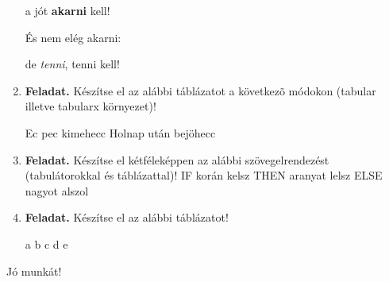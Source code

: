 \documentclass[12pt,a4paper]{article}
\begin{document}
\begin{enumerate}
\begin{center}
              a jót \textbf{akarni} kell! \par
              És nem elég akarni: \par
              de \textit{tenni},  tenni kell! \par
          \end{center}
    \item
          \textbf{Feladat.} Készítse el az alábbi táblázatot a következõ módokon (tabular illetve tabularx környezet)!
          \par

          Ec pec kimehecc
          Holnap után bejöhecc
          \par
    \item
          \textbf{Feladat.} Készítse el kétféleképpen az alábbi szövegelrendezést (tabulátorokkal és táblázattal)!
          IF korán kelsz
          THEN aranyat lelsz
          ELSE nagyot alszol
          \par
    \item

          \textbf{Feladat.} Készítse el az alábbi táblázatot!
          \par

          a b
          c d
          e
          \par

\end{enumerate}
Jó munkát!
\end{document}
